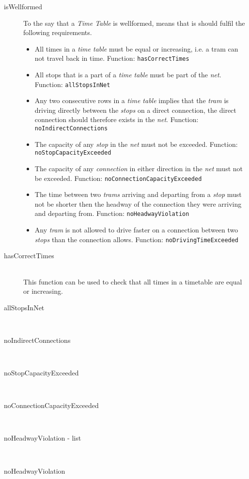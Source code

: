 \documentclass[a4]{article}
\begin{document}
\begin{description}
    \item[isWellformed] To the say that a \emph{Time Table} is wellformed, means that is should fulfil the following requirements.
        \begin{itemize}
            \item All times in a \emph{time table} must be equal or increasing, i.e. a tram can not travel back in time. Function: \verb=hasCorrectTimes=
            \item All stops that is a part of a \emph{time table} must be part of the \emph{net}. Function: \verb=allStopsInNet=
            \item Any two consecutive rows in a \emph{time table} implies that the \emph{tram} is driving directly between the \emph{stops} on a direct connection, the direct connection should therefore exists in the \emph{net}. Function: \verb=noIndirectConnections=
            \item The capacity of any \emph{stop} in the \emph{net} must not be exceeded. Function: \verb=noStopCapacityExceeded=
            \item The capacity of any \emph{connection} in either direction in the \emph{net} must not be exceeded. Function: \verb=noConnectionCapacityExceeded=
            \item The time between two \emph{trams} arriving and departing from a \emph{stop} must not be shorter then the headway of the connection they were arriving and departing from. Function: \verb=noHeadwayViolation=
            \item Any \emph{tram} is not allowed to drive faster on a connection between two \emph{stops} than the connection allows. Function: \verb=noDrivingTimeExceeded=
        \end{itemize}
\end{description}

\begin{description}
    \item[hasCorrectTimes] \hfill \\ This function can be used to check that all times in a timetable are equal or increasing. 
    \item[allStopsInNet] \hfill \\ 
    \item[noIndirectConnections] \hfill \\ 
    \item[noStopCapacityExceeded] \hfill \\ 
    \item[noConnectionCapacityExceeded] \hfill \\ 
    \item[noHeadwayViolation - list] \hfill \\ 
    \item[noHeadwayViolation] \hfill \\
\end{description}
\end{document}
